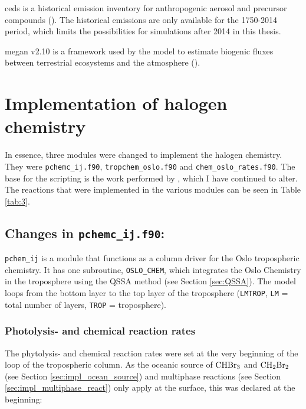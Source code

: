 \medskip

\acrshort{ceds} is a historical emission inventory for anthropogenic aerosol and precursor compounds (\cite{Lund2018}). The historical emissions are only available for the 1750-2014 period, which limits the possibilities for simulations after 2014 in this thesis. 

\medskip

\acrshort{megan} v2.10 is a framework used by the model to estimate biogenic fluxes between terrestrial ecosystems and the atmosphere (\cite{Guenther2012}). 


\section{Implementation of halogen chemistry}

In essence, three modules were changed to implement the halogen chemistry. They were \texttt{pchemc\_ij.f90}, \texttt{tropchem\_oslo.f90} and \texttt{chem\_oslo\_rates.f90}. The base for the scripting is the work performed by \cite{Susanne}, which I have continued to alter.  The reactions that were implemented in the various modules can be seen in Table \ref{tab:3}.





\subsection{Changes in \texttt{pchemc\_ij.f90}:}

\texttt{pchem\_ij} is a module that functions as a column driver for the Oslo tropospheric chemistry. It has one subroutine, \texttt{OSLO\_CHEM}, which integrates the Oslo Chemistry in the troposphere using the QSSA method (see Section \ref{sec:QSSA}). The model loops from the bottom layer to the top layer of the troposphere (\texttt{LMTROP}, \texttt{LM} = total number of layers, \texttt{TROP} = troposphere). 

\subsubsection{Photolysis- and chemical reaction rates}

The phytolysis- and chemical reaction rates were set at the very beginning of the loop of the tropospheric column. As the oceanic source of $\mathrm{CHBr_3}$ and $\mathrm{CH_2Br_2}$ (see Section \ref{sec:impl_ocean_source}) and multiphase reactions (see Section \ref{sec:impl_multiphase_react}) only apply at the surface, this was declared at the beginning:

